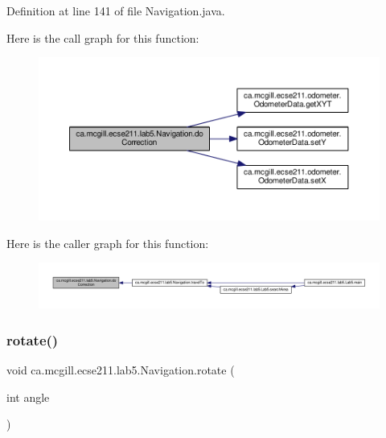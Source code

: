 Definition at line 141 of file Navigation.\+java.

Here is the call graph for this function\+:
\nopagebreak
\begin{figure}[H]
\begin{center}
\leavevmode
\includegraphics[width=350pt]{classca_1_1mcgill_1_1ecse211_1_1lab5_1_1_navigation_a73a89ddd822e0ba1cfd7a29c18aa7aea_cgraph}
\end{center}
\end{figure}
Here is the caller graph for this function\+:
\nopagebreak
\begin{figure}[H]
\begin{center}
\leavevmode
\includegraphics[width=350pt]{classca_1_1mcgill_1_1ecse211_1_1lab5_1_1_navigation_a73a89ddd822e0ba1cfd7a29c18aa7aea_icgraph}
\end{center}
\end{figure}
\mbox{\label{classca_1_1mcgill_1_1ecse211_1_1lab5_1_1_navigation_a5fcce0063a6b557d349a6fb5bf144c64}} 
\subsubsection{\texorpdfstring{rotate()}{rotate()}}
{\footnotesize\ttfamily void ca.\+mcgill.\+ecse211.\+lab5.\+Navigation.\+rotate (\begin{DoxyParamCaption}\item[{int}]{angle }\end{DoxyParamCaption})}

